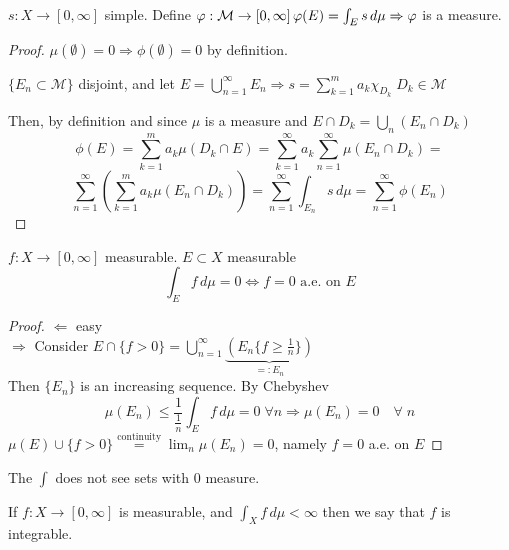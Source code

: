 \begin{theorem}
    \(s : X \to \left[0, \infty\right]\) simple. Define \(\phi : \mathcal{M} \to \left[0, \infty\right] \\ \phi(E) = \int_E s \, d\mu \\ \Rightarrow \phi \) is a measure. 
\end{theorem}

\begin{proof}
    \(\mu(\emptyset) =0 \Rightarrow \phi(\emptyset)=0 \) by definition. 
    \begin{definition}
        \(\{E_n \subset \mathcal{M}\}\) disjoint, and let \(E = \bigcup_{n=1}^\infty E_n \Rightarrow s = \sum_{k=1}^m a_k \chi_{D_k} \; D_k \in \mathcal{M}
        \)
    \end{definition}
    Then, by definition and since \(\mu\) is a measure and \(E \cap D_k = \bigcup_n (E_n \cap D_k)  \) 
    \[
        \phi(E) = \sum_{k=1}^m a_k \mu(D_k \cap E) = 
        \sum_{k=1}^\infty a_k \sum_{n=1}^\infty \mu(E_n \cap D_k)= 
    \]
    \[    
        \sum_{n=1}^\infty \left( \sum_{k=1}^m a_k \mu (E_n \cap D_k) \right) = 
        \sum_{n=1}^\infty \int_{E_n} s \, d\mu = 
        \sum_{n=1}^\infty \phi(E_n)
    \]
\end{proof}

\begin{theorem}
    \(f: X \to \left[0, \infty\right]\) measurable. \(E \subset X \) measurable 
    \[\int_E f \, d\mu =0 \Leftrightarrow f=0 \text{ a.e. on } E \]
\end{theorem}
\begin{proof}
    \( \Leftarrow \) easy \\
    \( \Rightarrow \) Consider \( E \cap \{f >0\} = \bigcup_{n=1}^\infty \underbrace{\left(E_n \{ f \geq \frac{1}{n} \} \right)}_{=:E_n} \) \\
    Then \(\{E_n\}\) is an increasing sequence. By Chebyshev 
    \[
        \mu (E_n) \leq \frac{1}{\frac{1}{n}} \int_E f \, d\mu =0 \; \forall n \Rightarrow \mu(E_n)=0 \quad \forall \; n 
    \]
    \(\mu(E) \cup \{f>0\} \overset{\text{continuity}}{=} \lim_n \mu (E_n)=0\), namely \(f=0\) a.e. on \(E\)
\end{proof}

The \(\int\) does not see sets with 0 measure.

\begin{definition}
    If \( f:X \to \left[0, \infty\right] \) is measurable, and \( \int_X f \, d\mu < \infty \) then we say that \(f\) is integrable.
\end{definition}

